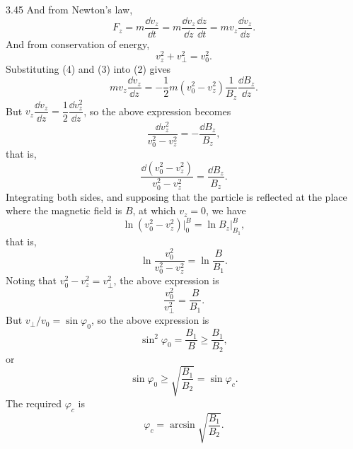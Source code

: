 \begin{solution}{3.45}
And from Newton's law,
\begin{equation}
F_z=m\frac{\dd v_z}{\dd t}=m\frac{\dd v_z}{\dd z}\frac{\dd z}{\dd t}=mv_z\frac{\dd v_z}{\dd z}. \tag{3}
\end{equation}
And from conservation of energy,
\begin{equation}
v_z^2+v_\perp^2=v_0^2. \tag{4}
\end{equation}
Substituting (4) and (3) into (2) gives
\[
mv_z\frac{\dd v_z}{\dd z}=-\frac{1}{2}m\left(v_0^2-v_z^2\right)\frac{1}{B_z}\frac{\dd B_z}{\dd z}.
\]
But $v_z\dfrac{\dd v_z}{\dd z}=\dfrac{1}{2}\dfrac{\dd v_z^2}{\dd z}$, so the above expression becomes
\[
\frac{\dd v_z^2}{v_0^2-v_z^2}=-\frac{\dd B_z}{B_z},
\]
that is,
\[
\frac{\dd\left(v_0^2-v_z^2\right)}{v_0^2-v_z^2}=\frac{\dd B_z}{B_z}.
\]
Integrating both sides, and supposing that the particle is reflected at the place where the magnetic field is $B$, at which $v_z=0$, we have
\[
\ln\left(v_0^2-v_z^2\right)\big|_0^B=\ln B_z\big|_{B_1}^{B},
\]
that is,
\[
\ln\frac{v_0^2}{v_0^2-v_z^2}=\ln\frac{B}{B_1}.
\]
Noting that $v_0^2-v_z^2=v_\perp^2$, the above expression is
\[
\frac{v_0^2}{v_\perp^2}=\frac{B}{B_1}.
\]
But $v_\perp/v_0=\sin\varphi_0$, so the above expression is
\[
\sin^2\varphi_0=\frac{B_1}{B}\geqslant\frac{B_1}{B_2},
\]
or
\[
\sin\varphi_0\geqslant\sqrt{\frac{B_1}{B_2}}=\sin\varphi_c.
\]
The required $\varphi_c$ is
\[
\varphi_c=\arcsin\sqrt{\frac{B_1}{B_2}}.
\]
\end{solution}

